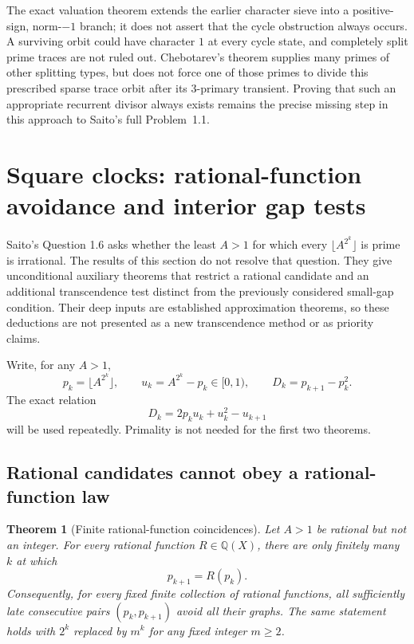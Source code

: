 \documentclass[11pt,a4paper]{article}
\newtheorem{theorem}{Theorem}[section]
\theoremstyle{definition}
\theoremstyle{remark}
\numberwithin{equation}{section}
\begin{document}
The exact valuation theorem extends the earlier character sieve
into a positive-sign, norm-$-1$ branch; it does not assert that
the cycle obstruction always occurs. A surviving orbit could
have character $1$ at every cycle state, and completely split
prime traces are not ruled out. Chebotarev's theorem supplies
many primes of other splitting types, but does not force one of
those primes to divide this prescribed sparse trace orbit after
its $3$-primary transient. Proving that such an appropriate
recurrent divisor always exists remains the precise missing
step in this approach to Saito's full Problem~1.1.


\section{Square clocks: rational-function avoidance and interior gap tests}
\label{f13:sec:square-second-round}

Saito's Question 1.6 asks whether the least $A>1$ for which every
$\lfloor A^{2^k}\rfloor$ is prime is irrational.  The results of this
section do not resolve that question.  They give unconditional auxiliary
theorems that restrict a rational candidate and an additional
transcendence test distinct from the previously considered small-gap
condition.  Their deep inputs are established approximation theorems,
so these deductions are not presented as a new transcendence method or
as priority claims.

Write, for any $A>1$,
\[
 p_k=\lfloor A^{2^k}\rfloor,\qquad
 u_k=A^{2^k}-p_k\in[0,1),\qquad
 D_k=p_{k+1}-p_k^2.
\]
The exact relation
\begin{equation}\label{f13:eq:square-defect-identity}
 D_k=2p_ku_k+u_k^2-u_{k+1}
\end{equation}
will be used repeatedly.  Primality is not needed for the first two
theorems.

\subsection{Rational candidates cannot obey a rational-function law}

\begin{theorem}[Finite rational-function coincidences]
\label{f13:thm:square-rational-avoidance}
Let $A>1$ be rational but not an integer.  For every rational function
$R\in\mathbb Q(X)$, there are only finitely many $k$ at which
\[
 p_{k+1}=R(p_k).
\]
Consequently, for every fixed finite collection of rational functions,
all sufficiently late consecutive pairs $(p_k,p_{k+1})$ avoid all
their graphs.
The same statement holds with $2^k$ replaced by $m^k$ for any fixed
integer $m\ge2$.
\end{theorem}
\end{document}
